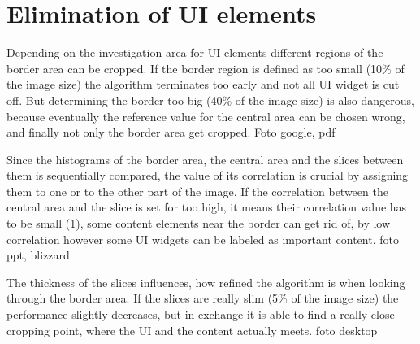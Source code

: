 \documentclass[draft,final]{vutinfth} %
\begin{document}
	\section{Elimination of UI elements} 
	Depending on the investigation area for UI elements different regions of the border area can be cropped. 
	If the border region is defined as too small (10\% of the image size) the algorithm terminates too early and not all UI widget is cut off.
	But determining the border too big (40\% of the image size) is also dangerous, because eventually the reference value for the central area can be chosen wrong, and finally not only the border area get cropped.
	Foto google, pdf \par 
	Since the histograms of the border area, the central area and the slices between them is sequentially compared, the value of its correlation is crucial by assigning them to one or to the other part of the image.
	If the correlation between the central area and the slice is set for too high, it means their correlation value has to be small (1), some content elements near the border can get rid of, by low correlation however some UI widgets can be labeled as important content. 
	foto ppt, blizzard\par 
	The thickness of the slices influences, how refined the algorithm is when looking through the border area.
	If the slices are really slim (5\% of the image size) the performance slightly decreases, but in exchange it is able to find a really close cropping point, where the UI and the content actually meets.
	foto desktop\par
\end{document}
